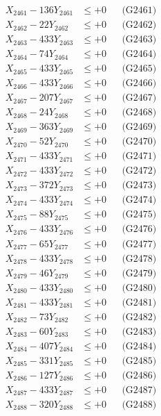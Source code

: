 \documentclass[a4paper,10pt]{article}
\begin{document}
{\begin{align}
\allowbreak
X_{2461} - 136Y_{2461} &\leq +0 && \text{(G2461)} \\
X_{2462} - 22Y_{2462} &\leq +0 && \text{(G2462)} \\
X_{2463} - 433Y_{2463} &\leq +0 && \text{(G2463)} \\
X_{2464} - 74Y_{2464} &\leq +0 && \text{(G2464)} \\
X_{2465} - 433Y_{2465} &\leq +0 && \text{(G2465)} \\
X_{2466} - 433Y_{2466} &\leq +0 && \text{(G2466)} \\
X_{2467} - 207Y_{2467} &\leq +0 && \text{(G2467)} \\
X_{2468} - 24Y_{2468} &\leq +0 && \text{(G2468)} \\
X_{2469} - 363Y_{2469} &\leq +0 && \text{(G2469)} \\
X_{2470} - 52Y_{2470} &\leq +0 && \text{(G2470)} \\
\allowbreak
X_{2471} - 433Y_{2471} &\leq +0 && \text{(G2471)} \\
X_{2472} - 433Y_{2472} &\leq +0 && \text{(G2472)} \\
X_{2473} - 372Y_{2473} &\leq +0 && \text{(G2473)} \\
X_{2474} - 433Y_{2474} &\leq +0 && \text{(G2474)} \\
X_{2475} - 88Y_{2475} &\leq +0 && \text{(G2475)} \\
X_{2476} - 433Y_{2476} &\leq +0 && \text{(G2476)} \\
X_{2477} - 65Y_{2477} &\leq +0 && \text{(G2477)} \\
X_{2478} - 433Y_{2478} &\leq +0 && \text{(G2478)} \\
X_{2479} - 46Y_{2479} &\leq +0 && \text{(G2479)} \\
X_{2480} - 433Y_{2480} &\leq +0 && \text{(G2480)} \\
\allowbreak
X_{2481} - 433Y_{2481} &\leq +0 && \text{(G2481)} \\
X_{2482} - 73Y_{2482} &\leq +0 && \text{(G2482)} \\
X_{2483} - 60Y_{2483} &\leq +0 && \text{(G2483)} \\
X_{2484} - 407Y_{2484} &\leq +0 && \text{(G2484)} \\
X_{2485} - 331Y_{2485} &\leq +0 && \text{(G2485)} \\
X_{2486} - 127Y_{2486} &\leq +0 && \text{(G2486)} \\
X_{2487} - 433Y_{2487} &\leq +0 && \text{(G2487)} \\
X_{2488} - 320Y_{2488} &\leq +0 && \text{(G2488)} \\

\end{align}}
\end{document}

